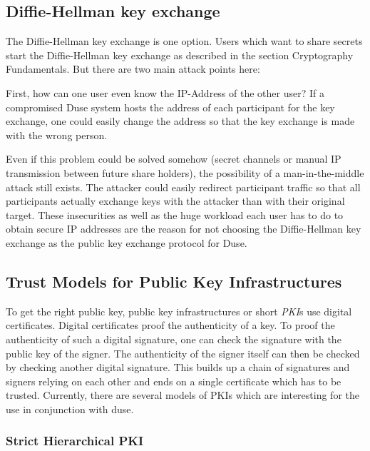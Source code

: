 \subsection{Diffie-Hellman key exchange}

The Diffie-Hellman key exchange is one option. Users which want to share secrets
start the Diffie-Hellman key exchange as described in the section Cryptography
Fundamentals. But there are two main attack points here:

First, how can one user even know the IP-Address of the other user? If a compromised
Duse system hosts the address of each participant for the key exchange, one could
easily change the address so that the key exchange is made with the wrong person.

Even if this problem could be solved somehow (secret channels or manual IP transmission
between future share holders), the possibility of a man-in-the-middle attack still
exists. The attacker could easily redirect participant traffic so that all participants
actually exchange keys with the attacker than with their original target.
These insecurities as well as the huge workload each user has to do to obtain
secure IP addresses are the reason for not choosing the Diffie-Hellman key exchange
as the public key exchange protocol for Duse.

\subsection{Trust Models for Public Key Infrastructures}

To get the right public key, public key infrastructures or short \textit{PKI}s use
digital certificates. Digital certificates proof the authenticity of a key. To proof
the authenticity of such a digital signature, one can check the signature with the
public key of the signer. The authenticity of the signer itself can then be checked
by checking another digital signature. This builds up a chain of signatures and 
signers relying on each other and ends on a single certificate which has to be trusted.
Currently, there are several models of PKIs which are interesting for the use
in conjunction with duse.

\subsubsection{Strict Hierarchical PKI}

